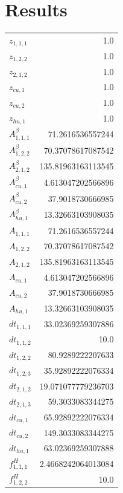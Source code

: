 \documentclass{article}%
\makeatletter
\let\mcnewpage=\newpage%
\newcommand{\TrickSupertabularIntoMulticols}{%
\renewcommand\newpage{%
\if@firstcolumn%
\hrule width\linewidth height0pt%
\columnbreak%
\else%
\mcnewpage%
\fi%
}%
}%
\makeatother
\begin{document}
\section{Results}%
\thispagestyle{plain}%
\begin{multicols*}{3}%
\TrickSupertabularIntoMulticols%
%
\begin{supertabular}{lr}%
	$z_{1,1,1}$ & 1.0 \\%
	$z_{1,2,2}$ & 1.0 \\%
	$z_{2,1,2}$ & 1.0 \\%
	$z_{cu,1}$ & 1.0 \\%
	$z_{cu,2}$ & 1.0 \\%
	$z_{hu,1}$ & 1.0 \\%
	$A_{1,1,1}^{\beta}$ & 71.2616536557244 \\%
	$A_{1,2,2}^{\beta}$ & 70.37078617087542 \\%
	$A_{2,1,2}^{\beta}$ & 135.81963163113545 \\%
	$A_{cu,1}^{\beta}$ & 4.613047202566896 \\%
	$A_{cu,2}^{\beta}$ & 37.9018730666985 \\%
	$A_{hu,1}^{\beta}$ & 13.32663103908035 \\%
	$A_{1,1,1}$ & 71.2616536557244 \\%
	$A_{1,2,2}$ & 70.37078617087542 \\%
	$A_{2,1,2}$ & 135.81963163113545 \\%
	$A_{cu,1}$ & 4.613047202566896 \\%
	$A_{cu,2}$ & 37.9018730666985 \\%
	$A_{hu,1}$ & 13.32663103908035 \\%
	$dt_{1,1,1}$ & 33.02369259307886 \\%
	$dt_{1,1,2}$ & 10.0 \\%
	$dt_{1,2,2}$ & 80.9289222207633 \\%
	$dt_{1,2,3}$ & 35.92892222076334 \\%
	$dt_{2,1,2}$ & 19.071077779236703 \\%
	$dt_{2,1,3}$ & 59.3033083344275 \\%
	$dt_{cu,1}$ & 65.92892222076334 \\%
	$dt_{cu,2}$ & 149.3033083344275 \\%
	$dt_{hu,1}$ & 63.02369259307888 \\%
	$f_{1,1,1}^{H}$ & 2.4668242064013084 \\%
	$f_{1,2,2}^{H}$ & 10.0 \\%

\end{supertabular}
\end{multicols*}
\end{document}
